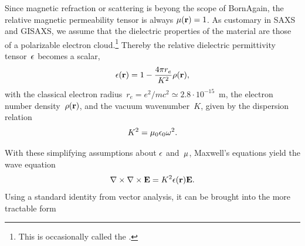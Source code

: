 Since magnetic refraction or scattering is beyong the scope of BornAgain,
the relative magnetic permeability tensor is always $\mathbf{\mu}(\mathbf{r})=1$.
%
%
As customary in SAXS and GISAXS,
%
%
we assume
that the dielectric properties of the material are those of a polarizable electron cloud.\footnote
{This is occasionally called the 
%
 \cite{Lau31}.}
Thereby the relative dielectric permittivity tensor~$\mathbf{\epsilon}$
%
%
becomes a scalar,
\begin{equation}
  \epsilon(\mathbf{r})=1-\frac{4\pi r_e}{K^2}\rho(\mathbf{r}),
\end{equation}
%
%
with the classical electron radius~$r_e=e^2/mc^2\simeq2.8\cdot10^{-15}$~m,
%
%
%
the electron number density~$\rho(\mathbf{r})$,
%
%
%
and the vacuum wavenumber~$K$,
given by the dispersion relation
\begin{equation}
  K^2 = \mu_0\epsilon_0\omega^2.
\end{equation}
%

With these simplifying assumptions about $\mathbf{\epsilon}$ and~$\mathbf{\mu}$,
Maxwell's equations yield the wave equation
\begin{equation}\label{ENabCrossNabE}
  \mathbf{\nabla}\times\mathbf{\nabla}\times\mathbf{E} = K^2\epsilon(\mathbf{r})\mathbf{E}.
\end{equation}
%
%
Using a standard identity from vector analysis, it can be brought into the more tractable form

